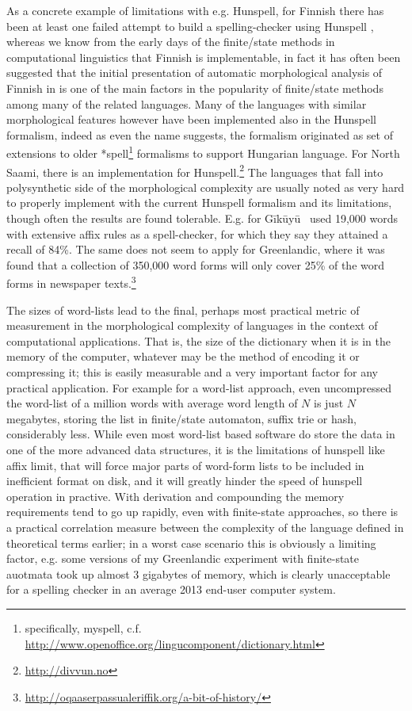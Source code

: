 \documentclass[officiallayout]{unihelcompling}
\begin{document}
As a concrete example of limitations with e.g. Hunspell, for Finnish there has
been at least one failed attempt to build a spelling-checker using Hunspell
\citep{pitkanen2006hunspell}, whereas we know from the early days of the
finite\-/state methods in computational linguistics that Finnish is
implementable, in fact it has often been suggested that the initial
presentation of automatic morphological analysis of Finnish in
\citet{koskenniemi1983twolevel} is one of the main factors in the popularity of
finite\-/state methods among many of the related languages. Many of the
languages with similar morphological features however have been implemented
also in the Hunspell formalism, indeed as even the name suggests, the formalism
originated as set of extensions to older *spell\footnote{specifically, 
    myspell, c.f.
\url{http://www.openoffice.org/lingucomponent/dictionary.html}} formalisms to
support Hungarian language.  For North Saami, there is an implementation for
Hunspell.\footnote{\url{http://divvun.no}} The languages that fall into polysynthetic side of the morphological
complexity are usually noted as very hard to properly implement with the
current Hunspell formalism and its limitations, though often the results are
found tolerable. E.g. for Gīkūyū~\citet{chege2010developing} used 19,000 words
with extensive affix rules as a spell-checker, for which they say they attained
a recall of 84\%. The same does not seem to apply for Greenlandic, where it was
found that a collection of 350,000 word forms will only cover 25\% of the
word forms in newspaper
texts.\footnote{\url{http://oqaaserpassualeriffik.org/a-bit-of-history/}}

The sizes of word-lists lead to the final, perhaps most practical metric of
measurement in the morphological complexity of languages in the context of
computational applications. That is, the size of the dictionary when it is in
the memory of the computer, whatever may be the method of encoding it or
compressing it; this is easily measurable and a very important factor for any
practical application.  For example for a word-list approach, even
uncompressed the word-list of a million words with average word length of $N$
is just $N$ megabytes, storing the list in finite\-/state automaton, suffix
trie or hash, considerably less. While even most word-list based software do
store the data in one of the more advanced data structures, it is the
limitations of hunspell like affix limit, that will force major parts of
word-form lists to be included in inefficient format on disk, and it will
greatly hinder the speed of hunspell operation in practive. With derivation and
compounding the memory requirements tend to go up rapidly, even with
finite-state approaches, so there is a practical correlation measure between
the complexity of the language defined in theoretical terms earlier; in a worst
case scenario this is obviously a limiting factor, e.g. some versions of my
Greenlandic experiment with finite-state auotmata took up almost 3 gigabytes of
memory, which is clearly unacceptable for a spelling checker in an average 2013
end-user computer system.
\end{document}
